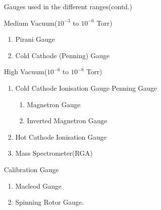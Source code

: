 \documentclass[11pt]{beamer}
\begin{document}
\begin{frame}{Gauges used in the different ranges(contd.)}

\begin{exampleblock}{Medium Vacuum($10^{-3}$  to $10^{-6}$  Torr) }

	\begin{enumerate}
	
		\item Pirani Gauge
		\item Cold Cathode (Penning) Gauge
		 	
	\end{enumerate}

\end{exampleblock}

\begin{exampleblock}{High Vacuum($10^{-6}$  to $10^{-8}$   Torr)}

	\begin{enumerate}
	
	
		\item Cold Cathode Ionisation Gauge Penning Gauge
		\begin{enumerate}
		\item Magnetron Gauge
		\item Inverted Magnetron Gauge
		\end{enumerate}
		\item  Hot Cathode Ionisation Gauge
		\item  Mass Spectrometer(RGA)
			
	\end{enumerate}

\end{exampleblock}

\begin{exampleblock}{Calibration Gauge}

	\begin{enumerate}
	
	
		\item Macleod Gauge
		\item Spinning Rotor Gauge.
			
	\end{enumerate}

\end{exampleblock}



\end{frame}
\end{document}
